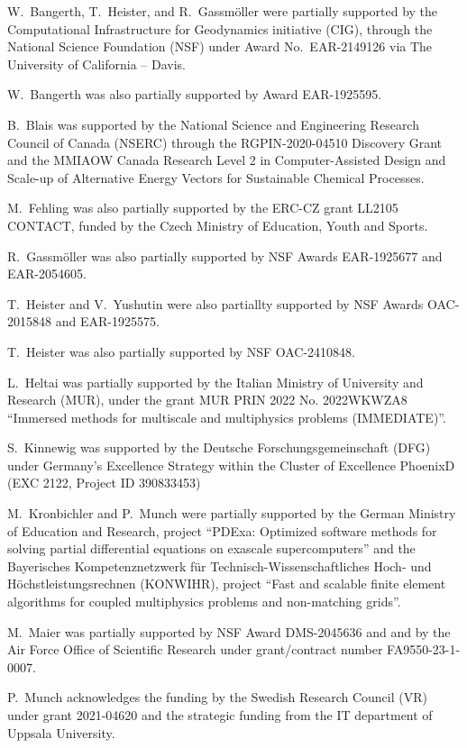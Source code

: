\documentclass{ansarticle-preprint}
\begin{document}
W.~Bangerth, T.~Heister, and R.~Gassm\"{o}ller were partially
supported by the Computational Infrastructure for Geodynamics initiative
(CIG), through the National Science Foundation (NSF) under Award
No.~EAR-2149126 via The University of California -- Davis.

W.~Bangerth was also partially supported by Award EAR-1925595.

B.~Blais was supported by the National Science and Engineering Research Council of Canada (NSERC)  through the RGPIN-2020-04510 Discovery Grant and the MMIAOW Canada Research Level 2 in Computer-Assisted Design and Scale-up of Alternative Energy Vectors for Sustainable Chemical Processes.

M.~Fehling was also partially supported by the ERC-CZ grant LL2105
CONTACT, funded by the Czech Ministry of Education, Youth and Sports.

R.~Gassm\"{o}ller was also partially supported by NSF Awards EAR-1925677
and EAR-2054605.

T.~Heister and V.~Yushutin were also partiallty supported by NSF Awards OAC-2015848 and EAR-1925575.

T.~Heister was also partially supported by NSF OAC-2410848.

L.~Heltai was partially supported by the Italian Ministry of
University and Research (MUR), under the grant MUR PRIN 2022 No. 2022WKWZA8
``Immersed methods for multiscale and multiphysics problems (IMMEDIATE)''.

S.~Kinnewig was supported by the Deutsche Forschungsgemeinschaft (DFG) under Germany’s Excellence
Strategy within the Cluster of Excellence PhoenixD (EXC 2122, Project ID 390833453)

M.~Kronbichler and P.~Munch were partially supported by the
German Ministry of Education and Research, project
``PDExa: Optimized software methods for solving partial differential
equations on exascale supercomputers'' and the Bayerisches Kompetenznetzwerk
f\"ur Technisch-Wissen\-schaft\-li\-ches Hoch- und H\"ochstleistungsrechnen
(KONWIHR), project ``Fast and scalable finite element algorithms for coupled
multiphysics problems and non-matching grids''.

M.~Maier was partially supported by NSF Award DMS-2045636 and and by the
Air Force Office of Scientific Research under grant/contract number
FA9550-23-1-0007.

P.~Munch acknowledges the funding by the Swedish Research Council (VR) under grant 2021-04620 and the strategic funding from the IT department of Uppsala University.
\end{document}
